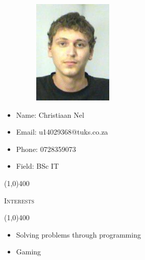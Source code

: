 \documentclass[12pt,a4paper]{report}
\begin{document}
\begin{minipage}{0.5\textwidth}
\begin{figure}[H]
\includegraphics[width=5cm,height=5cm,keepaspectratio]{u14029368.jpeg}
\end{figure}
\end{minipage} \hfill
\begin{minipage}{0.6\textwidth}
\begin{itemize}
\item[] Name: Christiaan Nel
\item[] Email: u14029368@tuks.co.za
\item[] Phone: 0728359073
\item[] Field: BSc IT
\end{itemize}
\end{minipage}

\begin{center}
	
	\line(1,0){400}\\
	{\scshape\large Interests\par}
	\line(1,0){400}\\
	\end{center}
	\begin{itemize}
\item Solving problems through programming
\item Gaming
\end{itemize}
	
\end{document}
